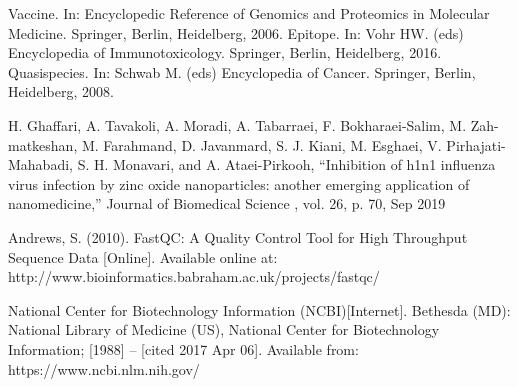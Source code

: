 \documentclass{article}
\begin{document}
 


 
\newpage
\begin{thebibliography}{9}

% 
%

Vaccine. In: Encyclopedic Reference of Genomics and Proteomics in Molecular Medicine. Springer, Berlin, Heidelberg, 2006. 
Epitope. In: Vohr HW. (eds) Encyclopedia of Immunotoxicology. Springer, Berlin, Heidelberg, 2016.
 Quasispecies. In: Schwab M. (eds) Encyclopedia of Cancer. Springer, Berlin, Heidelberg, 2008. 

H. Ghaffari, A. Tavakoli, A. Moradi, A. Tabarraei, F. Bokharaei-Salim, M. Zah-
matkeshan, M. Farahmand, D. Javanmard, S. J. Kiani, M. Esghaei, V. Pirhajati-
Mahabadi, S. H. Monavari, and A. Ataei-Pirkooh, “Inhibition of h1n1 influenza
virus  infection  by  zinc  oxide  nanoparticles:   another  emerging  application  of
nanomedicine,”
Journal of Biomedical Science
, vol. 26, p. 70, Sep 2019
 
 Andrews, S. (2010). FastQC:  A Quality Control Tool for High Throughput Sequence Data [Online]. Available online at: http://www.bioinformatics.babraham.ac.uk/projects/fastqc/
 
 
 
National Center for Biotechnology Information (NCBI)[Internet]. Bethesda (MD): National Library of Medicine (US), National Center for Biotechnology Information; [1988] – [cited 2017 Apr 06]. Available from: https://www.ncbi.nlm.nih.gov/


\end{thebibliography}
\end{document}
